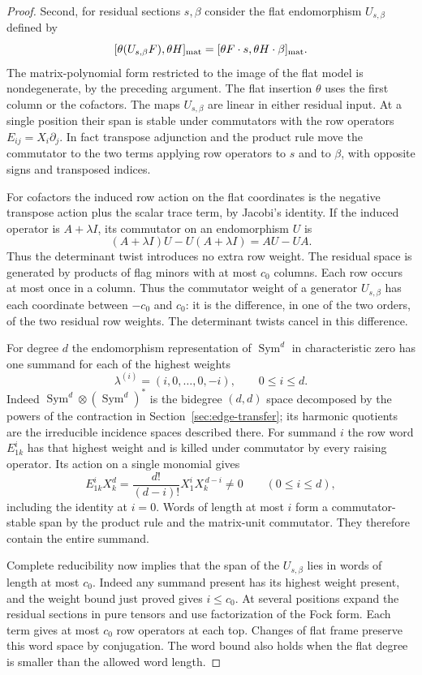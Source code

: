\begin{proof}
Second, for residual sections \(s,\beta\) consider the flat
endomorphism \(U_{s,\beta}\) defined by
\[
  [\theta(U_{s,\beta}F),\theta H]_{\rm mat}
       =[\theta F\cdot s,\theta H\cdot\beta]_{\rm mat}.
\]
The matrix-polynomial form restricted to the image of the flat
model is nondegenerate, by the preceding argument. The flat
insertion \(\theta\) uses the first column or the cofactors.
The maps \(U_{s,\beta}\) are linear in either residual input.
At a single position their span is stable under commutators
with the row operators \(E_{ij}=X_i\partial_j\).
In fact transpose adjunction and the product rule move the
commutator to the two terms applying row operators to \(s\) and
to \(\beta\), with opposite signs and transposed indices.

For cofactors the induced row action on the flat coordinates is
the negative transpose action plus the scalar trace term, by
Jacobi's identity. If the induced operator is \(A+\lambda I\), its commutator on
an endomorphism \(U\) is
\[
 (A+\lambda I)U-U(A+\lambda I)=AU-UA .
\]
Thus the determinant twist introduces no extra row weight.
The residual space is generated by products of flag minors with
at most \(c_0\) columns. Each row occurs at most once in a
column. Thus the commutator weight of a generator
\(U_{s,\beta}\) has each coordinate between \(-c_0\) and \(c_0\):
it is the difference, in one of the two orders, of the two
residual row weights. The determinant twists cancel in this difference.

For degree \(d\) the endomorphism representation of
\(\operatorname{Sym}^d\) in characteristic zero has one summand for each of the highest weights
\[
 \lambda^{(i)}=(i,0,\ldots,0,-i),\qquad 0\le i\le d.
\]
Indeed \(\operatorname{Sym}^d\otimes
(\operatorname{Sym}^d)^*\) is the bidegree \((d,d)\)
space decomposed by the powers of the contraction in
Section~\ref{sec:edge-transfer}; its harmonic quotients are
the irreducible incidence spaces described there. For summand
\(i\) the row word \(E_{1k}^i\) has that highest weight and
is killed under commutator by every raising operator. Its action on a single monomial gives
\[
 E_{1k}^i X_k^d
 =\frac{d!}{(d-i)!}X_1^i X_k^{\,d-i}\ne0
 \qquad(0\le i\le d),
\]
including the identity at \(i=0\). Words of length at
most \(i\) form a commutator-stable span by the product rule and
the matrix-unit commutator. They therefore contain the entire
summand.

Complete reducibility now implies that the span of the
\(U_{s,\beta}\) lies in words of length at most \(c_0\). Indeed
any summand present has its highest weight present, and the
weight bound just proved gives \(i\le c_0\).
At several positions expand the residual sections in pure
tensors and use factorization of the Fock form. Each term gives
at most \(c_0\) row operators at each top. Changes of flat frame
preserve this word space by conjugation. The word bound also holds when the flat degree is smaller than the allowed word length.


\end{proof}
